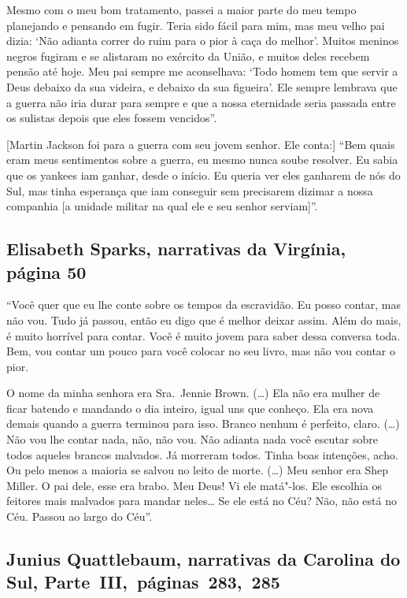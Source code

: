Mesmo com o meu bom tratamento, passei a maior parte do meu tempo
planejando e pensando em fugir. Teria sido fácil para mim, mas meu velho
pai dizia: `Não adianta correr do ruim para o pior à caça do melhor'.
Muitos meninos negros fugiram e se alistaram no exército da União, e
muitos deles recebem pensão até hoje. Meu pai sempre me aconselhava:
`Todo homem tem que servir a Deus debaixo da sua videira, e debaixo da
sua figueira'. Ele sempre lembrava que a guerra não iria durar para
sempre e que a nossa eternidade seria passada entre os sulistas depois
que eles fossem vencidos''.

{[}Martin Jackson foi para a guerra com seu jovem senhor. Ele conta:{]}
``Bem quais eram meus sentimentos sobre a guerra, eu mesmo nunca soube
resolver. Eu sabia que os yankees iam ganhar, desde o início. Eu queria
ver eles ganharem de nós do Sul, mas tinha esperança que iam conseguir
sem precisarem dizimar a nossa companhia {[}a unidade militar na qual
ele e seu senhor serviam{]}''.


\subsection{Elisabeth Sparks, narrativas da Virgínia, página 50}
\label{ref250} 

``Você quer que eu lhe conte sobre os tempos da escravidão. Eu posso
contar, mas não vou. Tudo já passou, então eu digo que é melhor deixar
assim. Além do mais, é muito horrível para contar. Você é muito jovem
para saber dessa conversa toda. Bem, vou contar um pouco para você
colocar no seu livro, mas não vou contar o pior.

O nome da minha senhora era Sra.~Jennie Brown. (\ldots{}) Ela não era
mulher de ficar batendo e mandando o dia inteiro, igual uns que conheço.
Ela era nova demais quando a guerra terminou para isso. Branco nenhum é
perfeito, claro. (\ldots{}) Não vou lhe contar nada, não, não vou. Não
adianta nada você escutar sobre todos aqueles brancos malvados. Já
morreram todos. Tinha boas intenções, acho. Ou pelo menos a maioria se
salvou no leito de morte. (\ldots{}) Meu senhor era Shep Miller. O pai
dele, esse era brabo. Meu Deus! Vi ele matá"-los. Ele escolhia os
feitores mais malvados para mandar neles\ldots{} Se ele está no Céu?
Não, não está no Céu. Passou ao largo do Céu''.

\subsection{Junius Quattlebaum, narrativas da Carolina do Sul, Parte~III,~páginas~283,~285}
\label{ref220}

